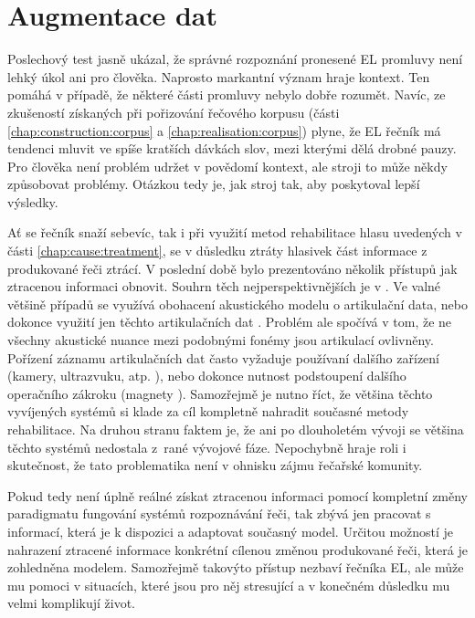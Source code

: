 \section{Augmentace dat}
\label{chap:realisation:augmentation}

Poslechový test jasně ukázal, že správné rozpoznání pronesené EL promluvy není lehký úkol ani pro člověka.
Naprosto markantní význam hraje kontext.
Ten pomáhá v případě, že některé části promluvy nebylo dobře rozumět.
Navíc, ze zkušeností získaných při pořizování řečového korpusu (části \ref{chap:construction:corpus} a \ref{chap:realisation:corpus}) plyne, že EL řečník má tendenci mluvit ve spíše kratších dávkách slov, mezi kterými dělá drobné pauzy.
Pro člověka není problém udržet v povědomí kontext, ale stroji to může někdy způsobovat problémy.
Otázkou tedy je, jak  stroj tak, aby poskytoval lepší výsledky.

Ať se řečník snaží sebevíc, tak i při využití metod rehabilitace hlasu uvedených v části \ref{chap:cause:treatment}, se v důsledku ztráty hlasivek část informace z produkované řeči ztrácí.
V poslední době bylo prezentováno několik přístupů jak ztracenou informaci obnovit.
Souhrn těch nejperspektivnějších je v \cite{Denby2010}.
Ve valné většině případů se využívá obohacení akustického modelu o artikulační data, nebo dokonce využití jen těchto artikulačních dat \cite{Hofe2013} .
Problém ale spočívá v tom, že ne všechny akustické nuance mezi podobnými fonémy jsou artikulací ovlivněny.
Pořízení záznamu artikulačních dat často vyžaduje používaní dalšího zařízení (kamery, ultrazvuku, atp. \cite{Hueber2010} \cite{Brumberg2010} \cite{Fagan2008} \cite{Hirahara2010} \cite{Jorgensen2010}), nebo dokonce nutnost podstoupení dalšího operačního zákroku (magnety \cite{Hofe2011}).
Samozřejmě je nutno říct, že většina těchto vyvíjených systémů si klade za cíl kompletně nahradit současné metody rehabilitace.
Na druhou stranu faktem je, že ani po dlouholetém vývoji se většina těchto systémů nedostala z~rané vývojové fáze.
Nepochybně hraje roli i skutečnost, že tato problematika není v ohnisku zájmu řečařské komunity.

Pokud tedy není úplně reálné získat ztracenou informaci pomocí kompletní změny paradigmatu fungování systémů rozpoznávání řeči, tak zbývá jen pracovat s informací, která je k dispozici a adaptovat současný model.
Určitou možností je nahrazení ztracené informace konkrétní cílenou změnou produkované řeči,
která je zohledněna modelem.
Samozřejmě takovýto přístup nezbaví řečníka EL, ale může mu pomoci v situacích, které jsou pro něj stresující a v konečném důsledku mu velmi komplikují život.

